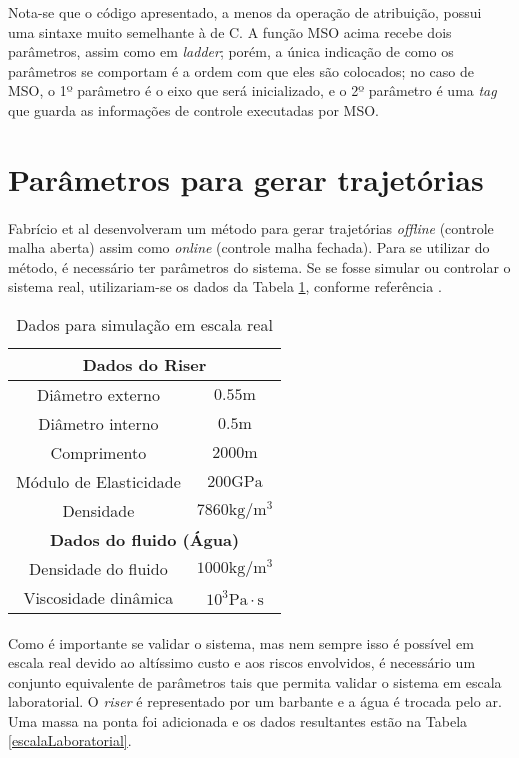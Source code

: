 Nota-se que o código apresentado, a menos da operação de atribuição, possui uma sintaxe muito semelhante à de C. A função MSO acima recebe dois parâmetros, assim como em \textit{ladder}; porém, a única indicação de como os parâmetros se comportam é a ordem com que eles são colocados; no caso de MSO, o 1º parâmetro é o eixo que será inicializado, e o 2º parâmetro é uma \textit{tag} que guarda as informações de controle executadas por MSO.


\section{Parâmetros para gerar trajetórias}

\paragraph{}Fabrício et al \cite{fabricioIFAC} desenvolveram um método para gerar trajetórias \textit{offline} (controle malha aberta) assim como \textit{online} (controle malha fechada). Para se utilizar do método, é necessário ter parâmetros do sistema. Se se fosse simular ou controlar o sistema real, utilizariam-se os dados da Tabela \ref{escalaReal}, conforme referência \cite{redytton}.

\begin{table}[!ht]
\centering
\caption{Dados para simulação em escala real\label{escalaReal} \cite{redytton}}
	\begin{tabular}{|c|c|}
	\hline
		\multicolumn{2}{|c|}{\textbf{Dados do Riser}}\\ \hline
		Diâmetro externo & $0.55\mathrm{m}$\\ \hline
		Diâmetro interno & $0.5\mathrm{m}$ \\ \hline
		Comprimento & $2000\mathrm{m}$ \\ \hline
		Módulo de Elasticidade & $200 \mathrm{GPa}$\\ \hline
		Densidade &  $7860\mathrm{kg}/\mathrm{m}^3$\\ \hline
		\multicolumn{2}{|c|}{\textbf{Dados do fluido (Água)}}\\ \hline
		Densidade do fluido &  $1000\mathrm{kg}/\mathrm{m}^3$\\ \hline
		Viscosidade dinâmica & $10^3 \mathrm{Pa}\cdot \mathrm{s}$ \\ \hline
	\end{tabular}
\end{table}

\paragraph{}Como é importante se validar o sistema, mas nem sempre isso é possível em escala real devido ao altíssimo custo e aos riscos envolvidos, é necessário um conjunto equivalente de parâmetros tais que permita validar o sistema em escala laboratorial. O \textit{riser} é representado por um barbante e a água é trocada pelo ar. Uma massa na ponta foi adicionada e os dados resultantes estão na Tabela \ref{escalaLaboratorial}.

